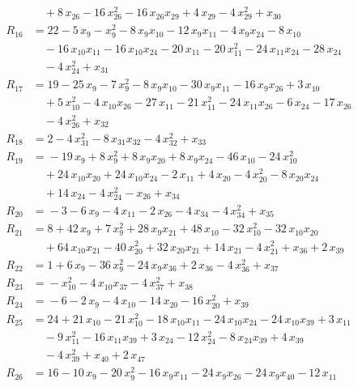 \begin{align*}
&\quad{} +8\,x_{26} -16\,x_{26}^{2} -16\,x_{26} x_{29} +4\,x_{29} -4\,x_{29}^{2} +x_{30} \\[2pt]
R_{16} &={} 22 -5\,x_{9} -x_{9}^{2} -8\,x_{9} x_{10} -12\,x_{9} x_{11} -4\,x_{9} x_{24} -8\,x_{10} \\
&\quad{} -16\,x_{10} x_{11} -16\,x_{10} x_{24} -20\,x_{11} -20\,x_{11}^{2} -24\,x_{11} x_{24} -28\,x_{24} \\
&\quad{} -4\,x_{24}^{2} +x_{31} \\[2pt]
R_{17} &={} 19 -25\,x_{9} -7\,x_{9}^{2} -8\,x_{9} x_{10} -30\,x_{9} x_{11} -16\,x_{9} x_{26} +3\,x_{10} \\
&\quad{} +5\,x_{10}^{2} -4\,x_{10} x_{26} -27\,x_{11} -21\,x_{11}^{2} -24\,x_{11} x_{26} -6\,x_{24} -17\,x_{26} \\
&\quad{} -4\,x_{26}^{2} +x_{32} \\[2pt]
R_{18} &={} 2 -4\,x_{31}^{2} -8\,x_{31} x_{32} -4\,x_{32}^{2} +x_{33} \\[2pt]
R_{19} &={} -19\,x_{9} +8\,x_{9}^{2} +8\,x_{9} x_{20} +8\,x_{9} x_{24} -46\,x_{10} -24\,x_{10}^{2} \\
&\quad{} +24\,x_{10} x_{20} +24\,x_{10} x_{24} -2\,x_{11} +4\,x_{20} -4\,x_{20}^{2} -8\,x_{20} x_{24} \\
&\quad{} +14\,x_{24} -4\,x_{24}^{2} -x_{26} +x_{34} \\[2pt]
R_{20} &={} -3 -6\,x_{9} -4\,x_{11} -2\,x_{26} -4\,x_{34} -4\,x_{34}^{2} +x_{35} \\[2pt]
R_{21} &={} 8 +42\,x_{9} +7\,x_{9}^{2} +28\,x_{9} x_{21} +48\,x_{10} -32\,x_{10}^{2} -32\,x_{10} x_{20} \\
&\quad{} +64\,x_{10} x_{21} -40\,x_{20}^{2} +32\,x_{20} x_{21} +14\,x_{21} -4\,x_{21}^{2} +x_{36} +2\,x_{39} \\[2pt]
R_{22} &={} 1 +6\,x_{9} -36\,x_{9}^{2} -24\,x_{9} x_{36} +2\,x_{36} -4\,x_{36}^{2} +x_{37} \\[2pt]
R_{23} &={} -x_{10}^{2} -4\,x_{10} x_{37} -4\,x_{37}^{2} +x_{38} \\[2pt]
R_{24} &={} -6 -2\,x_{9} -4\,x_{10} -14\,x_{20} -16\,x_{20}^{2} +x_{39} \\[2pt]
R_{25} &={} 24 +21\,x_{10} -21\,x_{10}^{2} -18\,x_{10} x_{11} -24\,x_{10} x_{24} -24\,x_{10} x_{39} +3\,x_{11} \\
&\quad{} -9\,x_{11}^{2} -16\,x_{11} x_{39} +3\,x_{24} -12\,x_{24}^{2} -8\,x_{24} x_{39} +4\,x_{39} \\
&\quad{} -4\,x_{39}^{2} +x_{40} +2\,x_{47} \\[2pt]
R_{26} &={} 16 -10\,x_{9} -20\,x_{9}^{2} -16\,x_{9} x_{11} -24\,x_{9} x_{26} -24\,x_{9} x_{40} -12\,x_{11} \\

\end{align*}
